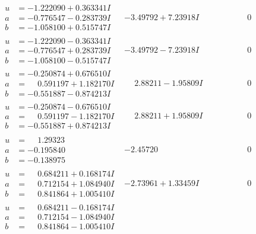 \documentclass[1p]{elsarticle_modified}
\theoremstyle{definition}
\begin{document}
$$\begin{array}{c|c|c}
\begin{aligned}
u &= -1.222090 + 0.363341 I \\
a &= -0.776547 - 0.283739 I \\
b &= -1.058100 + 0.515747 I\end{aligned}
 & -3.49792 + 7.23918 I & \phantom{-0.000000 } 0 \\ \hline\begin{aligned}
u &= -1.222090 - 0.363341 I \\
a &= -0.776547 + 0.283739 I \\
b &= -1.058100 - 0.515747 I\end{aligned}
 & -3.49792 - 7.23918 I & \phantom{-0.000000 } 0 \\ \hline\begin{aligned}
u &= -0.250874 + 0.676510 I \\
a &= \phantom{-}0.591197 + 1.182170 I \\
b &= -0.551887 - 0.874213 I\end{aligned}
 & \phantom{-}2.88211 - 1.95809 I & \phantom{-0.000000 } 0 \\ \hline\begin{aligned}
u &= -0.250874 - 0.676510 I \\
a &= \phantom{-}0.591197 - 1.182170 I \\
b &= -0.551887 + 0.874213 I\end{aligned}
 & \phantom{-}2.88211 + 1.95809 I & \phantom{-0.000000 } 0 \\ \hline\begin{aligned}
u &= \phantom{-}1.29323\phantom{ +0.000000I} \\
a &= -0.195840\phantom{ +0.000000I} \\
b &= -0.138975\phantom{ +0.000000I}\end{aligned}
 & -2.45720\phantom{ +0.000000I} & \phantom{-0.000000 } 0 \\ \hline\begin{aligned}
u &= \phantom{-}0.684211 + 0.168174 I \\
a &= \phantom{-}0.712154 + 1.084940 I \\
b &= \phantom{-}0.841864 + 1.005410 I\end{aligned}
 & -2.73961 + 1.33459 I & \phantom{-0.000000 } 0 \\ \hline\begin{aligned}
u &= \phantom{-}0.684211 - 0.168174 I \\
a &= \phantom{-}0.712154 - 1.084940 I \\
b &= \phantom{-}0.841864 - 1.005410 I\end{aligned}

\end{array}$$
\end{document}

